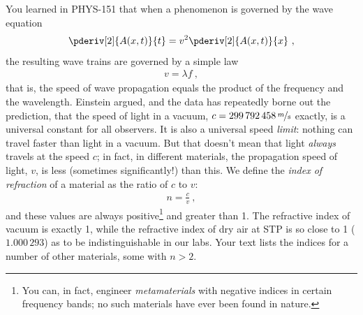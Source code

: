 \documentclass[12pt]{article}
\begin{document}
You learned in PHYS-151 that when a phenomenon is governed by the wave
equation 
\begin{gather*}
  \pderiv[2]{A(x,t)}{t} = v^2 \pderiv[2]{A(x,t)}{x}\ ,
\end{gather*}
the resulting wave trains are governed by a simple law
\begin{gather*}
  v = \lambda f\ ,
\end{gather*}
that is, the speed of wave propagation equals the product of the
frequency and the wavelength.  Einstein argued, and the data has
repeatedly borne out the prediction, that the speed of light in a
vacuum, $c = \unit[299\, 792\, 458]{\nicefrac{m}{s}}$ exactly, is a
universal constant for all observers.  It is also a universal speed
\textit{limit}: nothing can travel faster than light in a vacuum.  But
that doesn't mean that light \textit{always} travels at the speed $c$;
in fact, in different materials, the propagation speed of light, $v$,
is less (sometimes significantly!) than this.  We define the
\textit{index of refraction} of a material as the ratio of $c$ to $v$:
\begin{gather*}
  n = \frac{c}{v}\ ,
\end{gather*}
and these values are always positive\footnote{You can, in fact,
  engineer \textit{metamaterials} with negative indices in certain
  frequency bands; no such materials have ever been found in nature.}
and greater than 1.  The refractive index of vacuum is exactly 1,
while the refractive index of dry air at STP is so close to 1
($1.000\, 293$) as to be indistinguishable in our labs.  Your text
lists the indices for a number of other materials, some with $n>2$.
\end{document}
